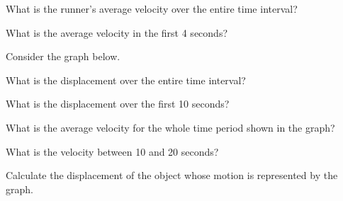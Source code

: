 \documentclass[../main.tex]{subfiles}
\begin{document}
\begin{exercise} \label{dixR7T}
    What is the runner’s average velocity over the entire time interval?
\end{exercise}

\begin{exercise} \label{YYxvX1}
   What is the average velocity in the first 4 seconds? 
\end{exercise}


\cyanhrule

\vspace{1em}

Consider the graph below.

\begin{center}
\end{center}

\begin{exercise} \label{5Wd4QG}
    What is the displacement over the entire time interval?
\end{exercise}


\begin{exercise} \label{OselF0}
   What is the displacement over the first 10 seconds? 
\end{exercise}


\begin{exercise} \label{ZRQnM6}
    What is the average velocity for the whole time period shown in the graph?
\end{exercise}

\begin{exercise} \label{fZtSlq}
    What is the velocity between 10 and 20 seconds?
\end{exercise}


\begin{exercise} \label{E3dHaa}
    Calculate the displacement of the object whose motion is represented by the graph.
\end{exercise}
\end{document}
